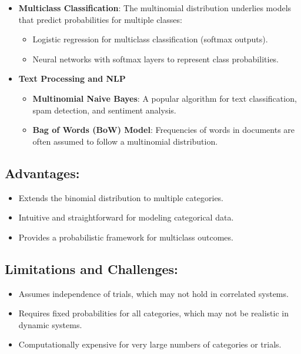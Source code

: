 \begin{itemize}
    \item \textbf{Multiclass Classification}: The multinomial distribution underlies models that predict probabilities for multiple classes:
    \begin{itemize}
        \item Logistic regression for multiclass classification (softmax outputs).
        \item Neural networks with softmax layers to represent class probabilities.
    \end{itemize}
    \item \textbf{Text Processing and NLP}
    \begin{itemize}
        \item \textbf{Multinomial Naive Bayes}: A popular algorithm for text classification, spam detection, and sentiment analysis.
        \item \textbf{Bag of Words (BoW) Model}: Frequencies of words in documents are often assumed to follow a multinomial distribution.
    \end{itemize}
\end{itemize}

\subsection*{Advantages:}
\begin{itemize}
    \item Extends the binomial distribution to multiple categories.
    \item Intuitive and straightforward for modeling categorical data.
    \item Provides a probabilistic framework for multiclass outcomes.
\end{itemize}

\subsection*{Limitations and Challenges:}
\begin{itemize}
    \item Assumes independence of trials, which may not hold in correlated systems.
    \item Requires fixed probabilities for all categories, which may not be realistic in dynamic systems.
    \item Computationally expensive for very large numbers of categories or trials.
\end{itemize}

